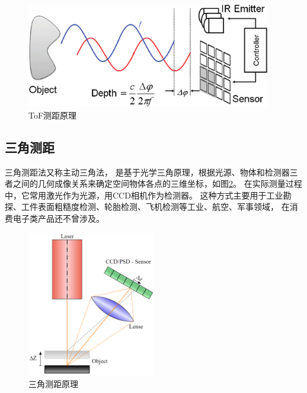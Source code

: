 \begin{figure}[h]
    \centering
    \includegraphics[width = 0.95\textwidth]{./Pictures/TOF.eps}
    \caption{ToF测距原理}
    \label{tof}
\end{figure}
\subsection{三角测距}

三角测距法又称主动三角法，
是基于光学三角原理，根据光源、物体和检测器三者之间的几何成像关系来确定空间物体各点的三维坐标，如图\ref{triangulation}。
在实际测量过程中，它常用激光作为光源，用CCD相机作为检测器。
这种方式主要用于工业勘探、工件表面粗糙度检测、轮胎检测、飞机检测等工业、航空、军事领域，
在消费电子类产品还不曾涉及。

\begin{figure}[h]
    \centering
    \includegraphics[width = 0.5\textwidth]{./Pictures/Triangulation}
    \caption{三角测距原理}
    \label{triangulation}
\end{figure}




